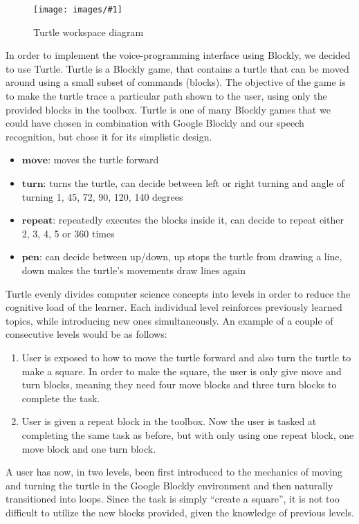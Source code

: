 \documentclass[]{article}
\newcommand\fig[3]{
\begin{figure}
  \begin{center}
  \texttt{[image: images/\#1]}
  \caption{#2} 
  \label{fig:#1}
  \end{center}
\end{figure}
}
\begin{document}
\fig{turtle_workspace.jpg}{Turtle workspace diagram}{width=4cm}

In order to implement the voice-programming interface using Blockly, we decided to use Turtle.
Turtle is a Blockly game, that contains a turtle that can be moved around using a small subset of commands (blocks). 
The objective of the game is to make the turtle trace a particular path shown to the user, using only the provided blocks in the toolbox.
Turtle is one of many Blockly games that we could have chosen in combination with Google Blockly and our speech recognition, but chose it for its simplistic design.

\begin{itemize}
  \item $\textbf{move}$: moves the turtle forward
  \item $\textbf{turn}$: turns the turtle, can decide between left or right turning and angle of turning  1, 45, 72, 90, 120, 140 degrees
  \item $\textbf{repeat}$: repeatedly executes the blocks inside it, can decide to repeat either 2, 3, 4, 5 or 360 times
  \item $\textbf{pen}$: can decide between up/down, up stops the turtle from drawing a line, down makes the turtle's movements draw lines again
\end{itemize}

Turtle evenly divides computer science concepts into levels in order to reduce the cognitive load of the learner.
Each individual level reinforces previously learned topics, while introducing new ones simultaneously. 
An example of a couple of consecutive levels would be as follows:
\begin{enumerate}
  \item User is exposed to how to move the turtle forward and also turn the turtle to make a square. In order to make the square, the user is only give move and turn blocks, meaning they need four move blocks and three turn blocks to complete the task.
  \item User is given a repeat block in the toolbox. Now the user is tasked at completing the same task as before, but with only using one repeat block, one move block and one turn block.
\end{enumerate}

A user has now, in two levels, been first introduced to the mechanics of moving and turning the turtle in the Google Blockly environment and then naturally transitioned into loops. Since the task is simply ``create a square'', it is not too difficult to utilize the new blocks provided, given the knowledge of previous levels.
\end{document}
